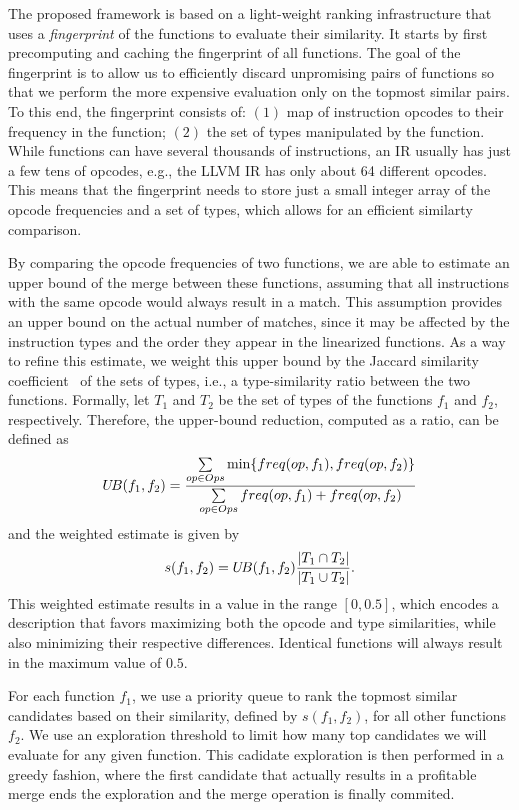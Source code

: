 The proposed framework is based on a light-weight ranking infrastructure that
uses a \textit{fingerprint} of the functions to evaluate their similarity.
It starts by first precomputing and caching the fingerprint of all functions.
The goal of the fingerprint is to allow us to efficiently discard unpromising
pairs of functions so that we perform the more expensive evaluation only on
the topmost similar pairs.
To this end, the fingerprint consists of: $(1)$ map of instruction opcodes to
their frequency in the function; $(2)$ the set of types manipulated by the
function.
While functions can have several thousands of instructions, an IR usually has
just a few tens of opcodes, e.g., the LLVM IR has only about 64 different
opcodes.
This means that the fingerprint needs to store just a small integer array of the
opcode frequencies and a set of types, which allows for an efficient similarty
comparison.

By comparing the opcode frequencies of two functions, we are able to estimate
an upper bound of the merge between these functions, assuming that all
instructions with the same opcode would always result in a match.
This assumption provides an upper bound on the actual number of matches, since
it may be affected by the instruction types and the order they appear in the
linearized functions.
As a way to refine this estimate, we weight this upper bound by the Jaccard
similarity coefficient~\cite{jaccard} of the sets of types, i.e., a
type-similarity ratio between the two functions.
Formally, let $T_1$ and $T_2$ be the set of types of the functions $f_1$ and
$f_2$, respectively.
Therefore, the upper-bound reduction, computed as a ratio, can be defined as
\vspace{-1.5ex}\[
   U\!B(f_1,f_2) = \frac{\sum\limits_{op \in Ops} \min\{freq(op,f_1),freq(op,f_2)\}}{\sum\limits_{op \in Ops} freq(op,f_1)+freq(op,f_2)}
\vspace{-1.5ex}
\]
and the weighted estimate is given by
\vspace{-1.5ex}\[
     s(f_1,f_2) = U\!B(f_1,f_2) \frac{|T_1 \cap T_2|}{|T_1 \cup T_2|}.
\vspace{-1.5ex}
\]
This weighted estimate results in a value in the range $[0,0.5]$,
which encodes a description that favors maximizing both the opcode and type
similarities, while also minimizing their respective differences.
Identical functions will always result in the maximum value of $0.5$.

For each function $f_1$, we use a priority queue to rank the topmost
similar candidates based on their similarity, defined by $s(f_1,f_2)$, for all
other functions $f_2$.
We use an exploration threshold to limit how many top candidates we will
evaluate for any given function.
This cadidate exploration is then performed in a greedy fashion, where the first
candidate that actually results in a profitable merge ends the exploration and
the merge operation is finally commited.

